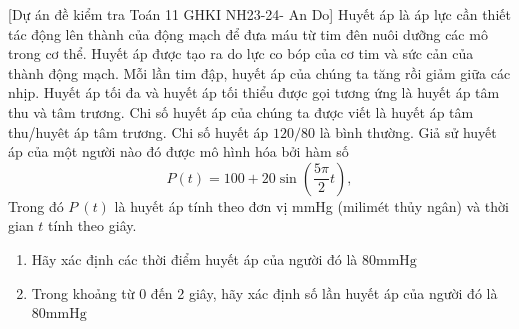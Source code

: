 \begin{bt}%
[Dự án đề kiểm tra Toán 11 GHKI NH23-24- An Do]%
	Huyết áp là áp lực cần thiết tác động lên thành của động mạch để đưa máu từ tim đên nuôi dưỡng các mô trong cơ thể. Huyết áp được tạo ra do lực co bóp của cơ tim và sức cản của thành động mạch. Mỗi lần tim đập, huyết áp của chúng ta tăng rồi giảm giữa các nhịp. Huyết áp tối đa và huyết áp tối thiểu được gọi tương ứng là huyết áp tâm thu và tâm trương. Chi số huyết áp của chúng ta được viết là huyết áp tâm thu/huyêt áp tâm trương. Chi số huyết áp $120/80$ là bình thường. Giả sử huyết áp của một người nào đó được mô hình hóa bởi hàm số
	$$
	P(t)=100+20 \sin \left(\dfrac{5 \pi}{2} t\right),
	$$
	Trong đó $P\ (t)$ là huyết áp tính theo đơn vị mmHg (milimét thủy ngân) và thời gian $t$ tính theo giây.
	\begin{enumerate}
		\item  Hãy xác định các thời điểm huyết áp của người đó là $80 \mathrm{mmHg}$
		\item  Trong khoảng từ 0 đến 2 giây, hãy xác định số lần huyết áp của người đó là $80 \mathrm{mmHg}$
	\end{enumerate}
\end{bt}

